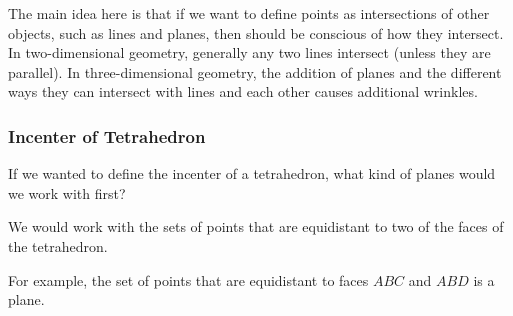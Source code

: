 




\begin{note*}
The main idea here is that if we want to define points as intersections of other objects, such as lines and planes, then should be conscious of how they intersect. In two-dimensional geometry, generally any two lines intersect (unless they are parallel). In three-dimensional geometry, the addition of planes and the different ways they can intersect with lines and each other causes additional wrinkles.
\end{note*}
\subsubsection{Incenter of Tetrahedron}
If we wanted to define the incenter of a tetrahedron, what kind of planes would we work with first?


We would work with the sets of points that are equidistant to two of the faces of the tetrahedron.

For example, the set of points that are equidistant to faces $ABC$ and $ABD$ is a plane.




